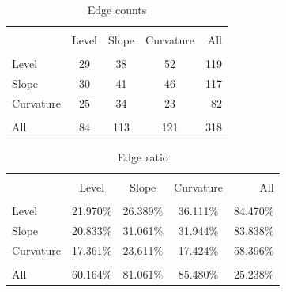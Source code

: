 \documentclass{article}
\begin{document}

\begin{table}[h]
\caption{Edge counts} %
\fontsize{10}{10}\selectfont
\centering%
\begin{tabular}{l | ccc  r}%
\hline\hline \\ [-1.5ex]                         %

	&	Level	&	Slope	&	Curvature	& All  \\ 
\hline \\ [-1.5ex]  
Level	&	29	&	38	&	52	&	119 	\\
Slope	&	30	&	41	&	46	&	117	\\
Curvature	&	25	&	34	&	23	&	82	\\
\hline \\ [-1.5ex]  
All	&	84	&	113	&	121	&	318	\\


\hline            
\end{tabular}
\label{table:nonlin}%
\end{table}


\begin{table}[h]
\caption{Edge ratio} %
\fontsize{10}{10}\selectfont
\centering%
\begin{tabular}{l | ccc  r}%
\hline\hline \\ [-1.5ex]                         %


	&	Level	&	Slope	&	Curvature	&	All	\\
\hline \\ [-1.5ex] 
Level	&	21.970\%	&	26.389\%	&	36.111\%	&	84.470\%	\\
Slope	&	20.833\%	&	31.061\%	&	31.944\%	&	83.838\%	\\
Curvature	&	17.361\%	&	23.611\%	&	17.424\%	&	58.396\%	\\
\hline \\ [-1.5ex]  
All	&	60.164\%	&	81.061\%	&	85.480\%	&	25.238\%	\\


\hline            
\end{tabular}
\label{table:nonlin}%
\end{table}
\end{document}
